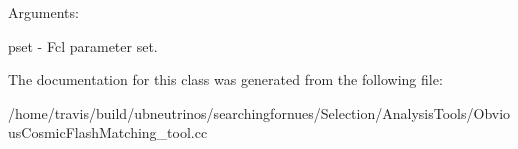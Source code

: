 Arguments\-:

pset -\/ Fcl parameter set. 

The documentation for this class was generated from the following file\-:\begin{DoxyCompactItemize}
\item 
/home/travis/build/ubneutrinos/searchingfornues/\-Selection/\-Analysis\-Tools/Obvious\-Cosmic\-Flash\-Matching\-\_\-tool.\-cc\end{DoxyCompactItemize}
